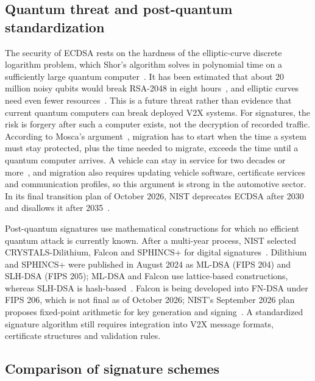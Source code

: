 \documentclass[11pt,a4paper]{article}
\begin{document}
\subsection{Quantum threat and post-quantum standardization}

The security of ECDSA rests on the hardness of the elliptic-curve discrete logarithm problem,
which Shor's algorithm solves in polynomial time on a sufficiently large quantum
computer~\cite{shor}. It has been estimated that about 20 million noisy qubits would break
RSA-2048 in eight hours~\cite{gidney}, and elliptic curves need even fewer
resources~\cite{roetteler}. This is a future threat rather than evidence that current quantum
computers can break deployed V2X systems. For signatures, the risk is forgery after such a
computer exists, not the decryption of recorded traffic. According to Mosca's
argument~\cite{mosca}, migration has to start when the time a system must stay protected, plus
the time needed to migrate, exceeds the time until a quantum computer arrives. A vehicle can
stay in service for two decades or more~\cite{yoshizawa22}, and migration also requires updating
vehicle software, certificate services and communication profiles, so this argument is strong in
the automotive sector. In its final transition plan of October 2026, NIST deprecates ECDSA after
2030 and disallows it after 2035~\cite{nistir8547}.

Post-quantum signatures use mathematical constructions for which no efficient quantum attack is
currently known. After a multi-year process, NIST selected CRYSTALS-Dilithium, Falcon and
SPHINCS+ for digital signatures~\cite{alagic}. Dilithium and SPHINCS+ were published in August
2024 as ML-DSA (FIPS 204) and SLH-DSA (FIPS 205); ML-DSA and Falcon use lattice-based
constructions, whereas SLH-DSA is hash-based~\cite{falcon,fips204,fips205}. Falcon is being
developed into FN-DSA under FIPS 206, which is not final as of October 2026; NIST's September
2026 plan proposes fixed-point arithmetic for key generation and signing~\cite{perlner}. A
standardized signature algorithm still requires integration into V2X message formats,
certificate structures and validation rules.

\subsection{Comparison of signature schemes}
\end{document}
